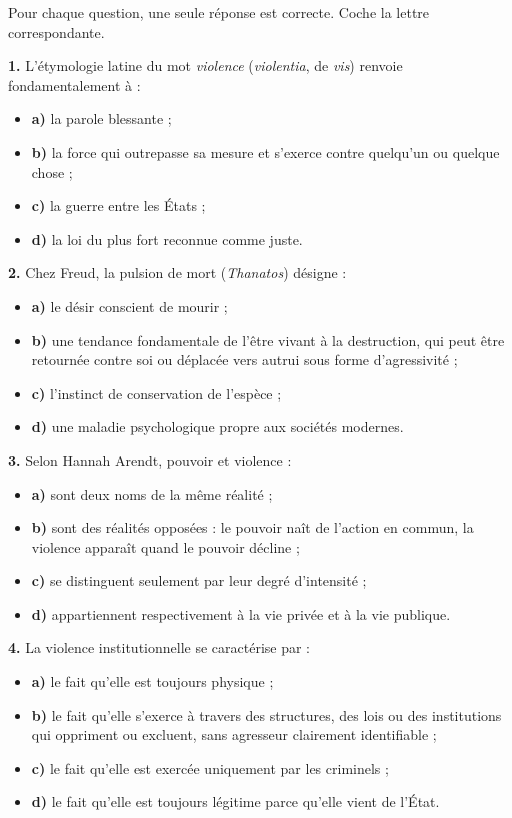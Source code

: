 \documentclass[11pt]{article}
\newcommand{\cle}[1]{{\popxbold\color{popdark}#1}}
\begin{document}
\begin{exercice}
Pour chaque question, une seule réponse est correcte. Coche la lettre correspondante.

\textbf{1.} L'étymologie latine du mot \emph{violence} (\emph{violentia}, de \emph{vis}) renvoie fondamentalement à :
\begin{itemize}
\item \textbf{a)} la parole blessante ;
\item \textbf{b)} la force qui outrepasse sa mesure et s'exerce contre quelqu'un ou quelque chose ;
\item \textbf{c)} la guerre entre les États ;
\item \textbf{d)} la loi du plus fort reconnue comme juste.
\end{itemize}

\textbf{2.} Chez Freud, la \cle{pulsion de mort} (\emph{Thanatos}) désigne :
\begin{itemize}
\item \textbf{a)} le désir conscient de mourir ;
\item \textbf{b)} une tendance fondamentale de l'être vivant à la destruction, qui peut être retournée contre soi ou déplacée vers autrui sous forme d'agressivité ;
\item \textbf{c)} l'instinct de conservation de l'espèce ;
\item \textbf{d)} une maladie psychologique propre aux sociétés modernes.
\end{itemize}

\textbf{3.} Selon Hannah Arendt, pouvoir et violence :
\begin{itemize}
\item \textbf{a)} sont deux noms de la même réalité ;
\item \textbf{b)} sont des réalités opposées : le pouvoir naît de l'action en commun, la violence apparaît quand le pouvoir décline ;
\item \textbf{c)} se distinguent seulement par leur degré d'intensité ;
\item \textbf{d)} appartiennent respectivement à la vie privée et à la vie publique.
\end{itemize}

\textbf{4.} La violence institutionnelle se caractérise par :
\begin{itemize}
\item \textbf{a)} le fait qu'elle est toujours physique ;
\item \textbf{b)} le fait qu'elle s'exerce à travers des structures, des lois ou des institutions qui oppriment ou excluent, sans agresseur clairement identifiable ;
\item \textbf{c)} le fait qu'elle est exercée uniquement par les criminels ;
\item \textbf{d)} le fait qu'elle est toujours légitime parce qu'elle vient de l'État.
\end{itemize}
\end{exercice}
\end{document}
